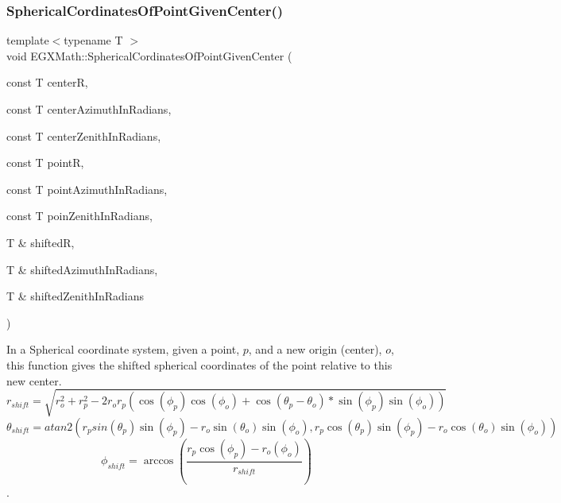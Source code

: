 \subsubsection{\texorpdfstring{Spherical\+Cordinates\+Of\+Point\+Given\+Center()}{SphericalCordinatesOfPointGivenCenter()}}
{\footnotesize\ttfamily template$<$typename T $>$ \\
void E\+G\+X\+Math\+::\+Spherical\+Cordinates\+Of\+Point\+Given\+Center (\begin{DoxyParamCaption}\item[{const T}]{centerR,  }\item[{const T}]{center\+Azimuth\+In\+Radians,  }\item[{const T}]{center\+Zenith\+In\+Radians,  }\item[{const T}]{pointR,  }\item[{const T}]{point\+Azimuth\+In\+Radians,  }\item[{const T}]{poin\+Zenith\+In\+Radians,  }\item[{T \&}]{shiftedR,  }\item[{T \&}]{shifted\+Azimuth\+In\+Radians,  }\item[{T \&}]{shifted\+Zenith\+In\+Radians }\end{DoxyParamCaption})}



In a Spherical coordinate system, given a point, $p$, and a new origin (center), $o$, this function gives the shifted spherical coordinates of the point relative to this new center. \[ r_{shift} = \sqrt{r_o^2+r_p^2 - 2 r_o r_p ( \cos(\phi_p) \cos(\phi_o) + \cos(\theta_p-\theta_o) * \sin(\phi_p) \sin(\phi_o))}\] \[ \theta_{shift} = atan2( r_p sin(\theta_p) \sin(\phi_p) - r_o \sin(\theta_o) \sin(\phi_o) , r_p \cos(\theta_p) \sin(\phi_p) - r_o \cos(\theta_o) \sin(\phi_o) )\] \[ \phi_{shift} = \arccos(\frac{r_p \cos(\phi_p) - r_o (\phi_o)}{r_{shift}}) \]. 

